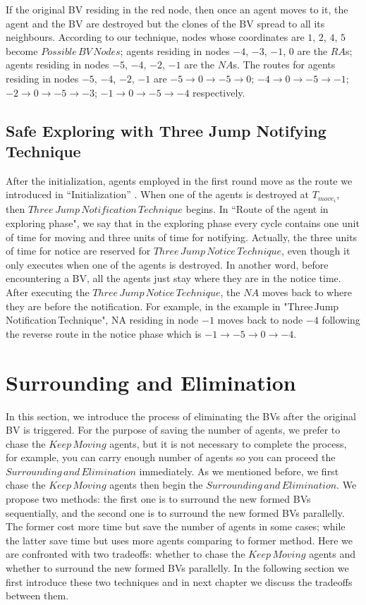 \documentclass[conference]{IEEEtran}
\begin{document}
If the original BV residing in the red node, then once an agent moves to it, the agent and the BV are destroyed but the clones of the BV spread to all its neighbours. According to our technique, nodes whose coordinates are $1$, $2$, $4$, $5$ become $Possible\,BV\,Nodes$; agents residing in nodes $-4$, $-3$, $-1$, $0$ are the $RA$s; agents residing in nodes $-5$, $-4$, $-2$, $-1$ are the $NA$s. The routes for agents residing in nodes $-5$, $-4$, $-2$, $-1$ are $-5{\rightarrow}0{\rightarrow}-5{\rightarrow}0$; $-4{\rightarrow}0{\rightarrow}-5{\rightarrow}-1$; $-2{\rightarrow}0{\rightarrow}-5{\rightarrow}-3$; $-1{\rightarrow}0{\rightarrow}-5{\rightarrow}-4$ respectively.\\

\subsection{Safe Exploring with Three Jump Notifying Technique}

After the initialization, agents employed in the first round move as the route we introduced in ``Initialization'' . When one of the agents is destroyed at $T_{move_i}$, then $Three\,Jump\,Notification\,Technique$ begins. In ``Route of the agent in exploring phase", we say that in the exploring phase every cycle contains one unit of time for moving and three units of time for notifying. Actually, the three units of time for notice are reserved for $Three\,Jump\, Notice\,Technique$, even though it only executes when one of the agents is destroyed. In another word, before encountering a BV, all the agents just stay where they are in the notice time.
After executing the $Three\,Jump\,Notice\,Technique$, the $NA$ moves back to where they are before the notification. For example, in the example in "Three\,Jump\,Notification\,Technique", NA residing in node $-1$ moves back to node $-4$ following the reverse route in the notice phase which is $-1{\rightarrow}-5{\rightarrow}0{\rightarrow}-4$. 

\section{Surrounding and Elimination}
In this section, we introduce the process of eliminating the BVs after the original BV is triggered. For the purpose of saving the number of agents, we prefer to chase the $Keep\,Moving$ agents, but it is not necessary to complete the process, for example, you can carry enough number of agents so you can proceed the $Surrounding\,and\,Elimination$ immediately. As we mentioned before, we first chase the $Keep\,Moving$ agents then begin the $Surrounding\,and\,Elimination$. We propose two methods: the first one is to surround the new formed BVs sequentially, and the second one is to surround the new formed BVs parallelly. The former cost more time but save the number of agents in some cases; while the latter save time but uses more agents comparing to former method. Here we are confronted with two tradeoffs: whether to chase the $Keep\,Moving$ agents and whether to surround the new formed BVs parallelly. In the following section we first introduce these two techniques and in next chapter we discuss the tradeoffs between them.
\end{document}
